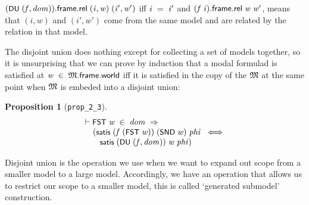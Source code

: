 \documentclass[letterpaper]{article}
\newtheorem{prop}{Proposition}
\renewcommand{\HOLConst}[1]{{\textsf{\upshape\small #1}}}
\renewcommand{\HOLinline}[1]{\ensuremath{#1}}
\newenvironment{holmath}{\begin{displaymath}\begin{array}{l}}{\end{array}\end{displaymath}\ignorespacesafterend}
\begin{document}
 \HOLinline{(\HOLConst{DU}\;(\HOLFreeVar{f}\HOLSymConst{,}\HOLFreeVar{dom})).\HOLFieldName{frame}.\HOLFieldName{rel}\;(\HOLFreeVar{i}\HOLSymConst{,}\HOLFreeVar{w})\;(\HOLFreeVar{i\sp{\prime}}\HOLSymConst{,}\HOLFreeVar{w\sp{\prime}})} iff \HOLinline{\HOLFreeVar{i}\;\HOLSymConst{=}\;\HOLFreeVar{i\sp{\prime}}} and \HOLinline{(\HOLFreeVar{f}\;\HOLFreeVar{i}).\HOLFieldName{frame}.\HOLFieldName{rel}\;\HOLFreeVar{w}\;\HOLFreeVar{w\sp{\prime}}}, means that $(i,w)$ and $(i',w')$ come from the same model and are related by the relation in that model. 

The disjoint union does nothing except for collecting a set of models together, so it is unsurprising that we can prove by induction that a modal formulad is satisfied at \HOLinline{\HOLFreeVar{w}\;\HOLSymConst{\HOLTokenIn{}}\;\HOLFreeVar{\ensuremath{\mathfrak{M}}}.\HOLFieldName{frame}.\HOLFieldName{world}} iff it is satisfied in the copy of the \HOLinline{\HOLFreeVar{\ensuremath{\mathfrak{M}}}} at the same point when \HOLinline{\HOLFreeVar{\ensuremath{\mathfrak{M}}}} is embeded into a disjoint union:
\begin{prop}[\texttt{prop_2_3}]
\begin{holmath}
  \ensuremath{\HOLTokenTurnstile}\HOLConst{FST}\;\HOLFreeVar{w}\;\HOLSymConst{\HOLTokenIn{}}\;\HOLFreeVar{dom}\;\HOLSymConst{\HOLTokenImp{}}\\
\;\;\;\;\;(\HOLConst{satis}\;(\HOLFreeVar{f}\;(\HOLConst{FST}\;\HOLFreeVar{w}))\;(\HOLConst{SND}\;\HOLFreeVar{w})\;\HOLFreeVar{phi}\;\HOLSymConst{\HOLTokenEquiv{}}\\
\;\;\;\;\;\;\;\;\HOLConst{satis}\;(\HOLConst{DU}\;(\HOLFreeVar{f}\HOLSymConst{,}\HOLFreeVar{dom}))\;\HOLFreeVar{w}\;\HOLFreeVar{phi})
\end{holmath}
\end{prop}

Disjoint union is the operation we use when we want to expand out scope from a smaller model to a large model. Accordingly, we have an operation that allows us to restrict our scope to a smaller model, this is called `generated submodel' construction. 
\end{document}
